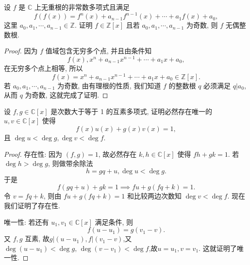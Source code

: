 \documentclass[../../main.tex]{subfiles}
\begin{document}
\begin{example}
设 \( f \) 是 \( \mathbb{C} \) 上无重根的非常数多项式且满足
\[
f(f(x)) = f^n(x) + a_{n-1}f^{n-1}(x) + \cdots + a_1f(x) + a_0,
\]
这里 \( a_0, a_1, \cdots, a_{n-1} \in \mathbb{Z} \). 证明 \( f \in \mathbb{Z}[x] \) 且若 \( a_0, a_1, \cdots, a_{n-1} \) 为奇数, 则 \( f \) 无偶整数根.
\end{example}
\begin{proof}
因为 \( f \) 值域包含无穷多个点, 并且由条件知
\[
f(x), x^n + a_{n-1}x^{n-1} + \cdots + a_1x + a_0,
\]
在无穷多个点上相等, 所以
\[
f(x) = x^n + a_{n-1}x^{n-1} + \cdots + a_1x + a_0 \in \mathbb{Z}[x].
\]
若 \( a_0, a_1, \cdots, a_{n-1} \) 为奇数, 由有理根的性质, 我们知道 \( f \) 的整数根 \( q \) 必须满足 \( q|a_0 \), 从而 \( q \) 为奇数, 这就完成了证明.

\end{proof}

\begin{proposition}
设 \( f,g \in \mathbb{C}[x] \) 是次数大于等于 1 的互素多项式, 证明必然存在唯一的 \( u,v \in \mathbb{C}[x] \) 使得
\[
f(x)u(x) + g(x)v(x) = 1,
\]
且 \( \deg u < \deg g, \deg v < \deg f \).
\end{proposition}
\begin{proof}
存在性:
因为 \( (f,g) = 1 \), 故必然存在 \( k,h \in \mathbb{C}[x] \) 使得 \( fh + gk = 1 \). 若 \( \deg h > \deg g \), 则做带余除法
\[
h = gq + u, \deg u < \deg g.
\]
于是
\[
f(gq + u) + gk = 1 \implies fu + g(fq + k) = 1.
\]
令 \( v = fq + k \), 则由 \( fu + g(fq + k) = 1 \) 和比较两边次数知 \( \deg v < \deg f \). 现在我们证明了存在性.

唯一性:
若还有 \( u_1, v_1 \in \mathbb{C}[x] \) 满足条件, 则
\[
f(u - u_1) = g(v_1 - v).
\]
又 \( f,g \) 互素, 故$
g|(u - u_1), f|(v_1 - v)$,又$\deg (u-u_1)<\deg g,\,\deg(v-v_1)<\deg f$,故$u = u_1, v = v_1$.
这就证明了唯一性.

\end{proof}
\end{document}
